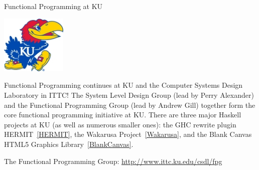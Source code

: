\begin{hcarentry}{Functional Programming at KU}
\label{ukansas}
\makeheader

\begin{center}
\includegraphics[width=0.235\textwidth]{html/jh2.jpg}
\end{center}

Functional Programming continues at KU and
the Computer Systems Design Laboratory in ITTC!
The System Level Design Group (lead by Perry Alexander)
and the Functional Programming Group (lead by Andrew Gill)
together form the core functional programming initiative at KU.
There are three major Haskell projects at KU (as
well as numerous smaller ones):
the GHC rewrite plugin HERMIT~\cref{HERMIT},
the Wakarusa Project~\cref{Wakarusa},
and the Blank Canvas HTML5 Graphics Library~\cref{BlankCanvas}.

\FurtherReading
\begin{compactitem}
\item   The Functional Programming Group:
    \url{http://www.ittc.ku.edu/csdl/fpg}
\end{compactitem}
\end{hcarentry}
